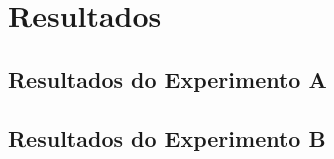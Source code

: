 \chapter{Resultados}
\label{chap:resultados}

\section{Resultados do Experimento A}
\label{sec:resultados-do-experimento-a}

\section{Resultados do Experimento B}
\label{sec:resultados-do-experimento-b}
